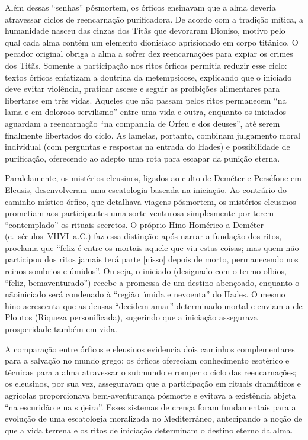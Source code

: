 Além dessas “senhas” pósmortem, os órficos ensinavam que a alma deveria atravessar ciclos de reencarnação purificadora. De acordo com a tradição mítica, a humanidade nasceu das cinzas dos Titãs que devoraram Dioniso, motivo pelo qual cada alma contém um elemento dionisíaco aprisionado em corpo titânico. O pecador original obriga a alma a sofrer dez reencarnações para expiar os crimes dos Titãs. Somente a participação nos ritos órficos permitia reduzir esse ciclo: textos órficos enfatizam a doutrina da metempsicose, explicando que o iniciado deve evitar violência, praticar ascese e seguir as proibições alimentares para libertarse em três vidas. Aqueles que não passam pelos ritos permanecem “na lama e em doloroso servilismo” entre uma vida e outra, enquanto os iniciados aguardam a reencarnação “na companhia de Orfeu e dos deuses”, até serem finalmente libertados do ciclo. As lamelas, portanto, combinam julgamento moral individual (com perguntas e respostas na entrada do Hades) e possibilidade de purificação, oferecendo ao adepto uma rota para escapar da punição eterna.

Paralelamente, os mistérios eleusinos, ligados ao culto de Deméter e Perséfone em Eleusis, desenvolveram uma escatologia baseada na iniciação. Ao contrário do caminho místico órfico, que detalhava viagens pósmortem, os mistérios eleusinos prometiam aos participantes uma sorte venturosa simplesmente por terem “contemplado” os rituais secretos. O próprio Hino Homérico a Deméter (c. séculos VIIVI a.C.) faz essa distinção: após narrar a fundação dos ritos, proclama que “feliz é entre os mortais aquele que viu estas coisas; mas quem não participou dos ritos jamais terá parte [nisso] depois de morto, permanecendo nos reinos sombrios e úmidos”. Ou seja, o iniciado (designado com o termo olbios, “feliz, bemaventurado”) recebe a promessa de um destino abençoado, enquanto o nãoiniciado será condenado à “região úmida e nevoenta” do Hades. O mesmo hino acrescenta que as deusas “decidem amar” determinado mortal e enviam a ele Ploutos (Riqueza personificada), sugerindo que a iniciação assegurava prosperidade também em vida.

A comparação entre órficos e eleusinos evidencia dois caminhos complementares para a salvação no mundo grego: os órficos ofereciam conhecimento esotérico e técnicas para a alma atravessar o submundo e romper o ciclo das reencarnações; os eleusinos, por sua vez, asseguravam que a participação em rituais dramáticos e agrícolas proporcionava bem-aventurança pósmorte e evitava a existência abjeta “na escuridão e na sujeira”. Esses sistemas de crença foram fundamentais para a evolução de uma escatologia moralizada no Mediterrâneo, antecipando a noção de que a vida terrena e os ritos de iniciação determinam o destino eterno da alma.


